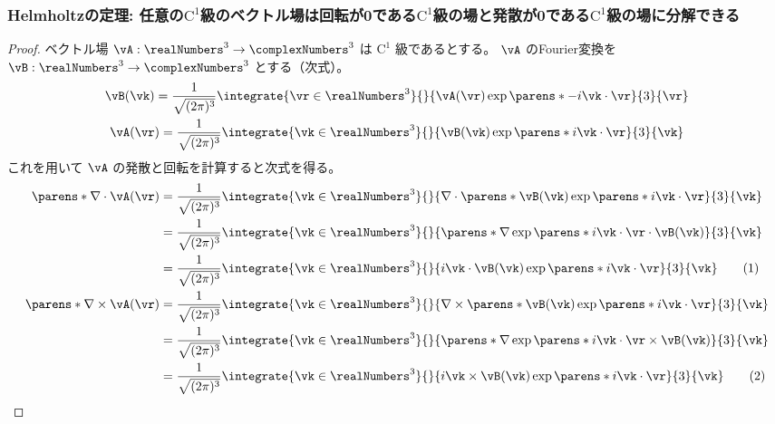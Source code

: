             \subsubsection{Helmholtzの定理: 任意の\texorpdfstring{$\mathrm{C}^1$}{C\string^1}級のベクトル場は回転が\texorpdfstring{$\bm{0}$}{0}である\texorpdfstring{$\mathrm{C}^1$}{C\string^1}級の場と発散が0である\texorpdfstring{$\mathrm{C}^1$}{C\string^1}級の場に分解できる}
            \newcommand*{\vBO}{\bm{B}_\text{O}(\vk)}
            \newcommand*{\vBP}{\bm{B}_\text{P}(\vk)}
            \begin{proof}
                \quad\par
                ベクトル場 $\vA:\realNumbers^3\to\complexNumbers^3$ は $\mathrm{C}^1$ 級であるとする。
                $\vA$ のFourier変換を $\vB:\realNumbers^3\to\complexNumbers^3$ とする（次式）。
                \begin{gather*}
                    \vB(\vk) = \frac{1}{\sqrt{(2\pi)^3}}\integrate{\vr\in\realNumbers^3}{}{\vA(\vr)\exp\parens*{-i\vk\cdot\vr}}{3}{\vr} \\
                    \vA(\vr) = \frac{1}{\sqrt{(2\pi)^3}}\integrate{\vk\in\realNumbers^3}{}{\vB(\vk)\exp\parens*{i\vk\cdot\vr}}{3}{\vk}
                \end{gather*}
                これを用いて $\vA$ の発散と回転を計算すると次式を得る。
                \begin{align*}
                    \parens*{\nabla\cdot\vA}(\vr) &= \frac{1}{\sqrt{(2\pi)^3}}\integrate{\vk\in\realNumbers^3}{}{\nabla\cdot\parens*{\vB(\vk)\exp\parens*{i\vk\cdot\vr}}}{3}{\vk} \\
                    &= \frac{1}{\sqrt{(2\pi)^3}}\integrate{\vk\in\realNumbers^3}{}{\parens*{\nabla\exp\parens*{i\vk\cdot\vr}}\cdot\vB(\vk)}{3}{\vk} \\
                    &= \frac{1}{\sqrt{(2\pi)^3}}\integrate{\vk\in\realNumbers^3}{}{i\vk\cdot\vB(\vk)\exp\parens*{i\vk\cdot\vr}}{3}{\vk} \tag{1} \\
                    \parens*{\nabla\times\vA}(\vr) &= \frac{1}{\sqrt{(2\pi)^3}}\integrate{\vk\in\realNumbers^3}{}{\nabla\times\parens*{\vB(\vk)\exp\parens*{i\vk\cdot\vr}}}{3}{\vk} \\
                    &= \frac{1}{\sqrt{(2\pi)^3}}\integrate{\vk\in\realNumbers^3}{}{\parens*{\nabla\exp\parens*{i\vk\cdot\vr}}\times\vB(\vk)}{3}{\vk} \\
                    &= \frac{1}{\sqrt{(2\pi)^3}}\integrate{\vk\in\realNumbers^3}{}{i\vk\times\vB(\vk)\exp\parens*{i\vk\cdot\vr}}{3}{\vk} \tag{2}

\end{align*}
\end{proof}
